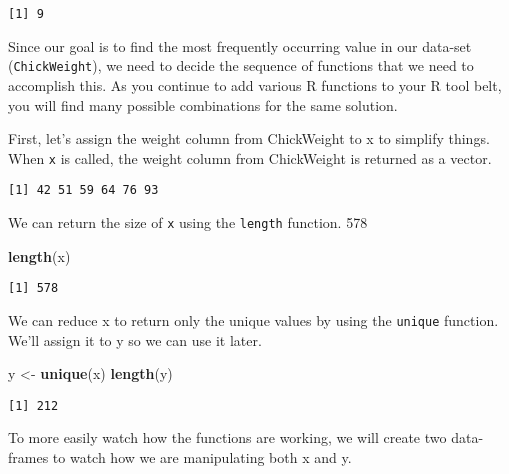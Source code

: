 \documentclass[12pt,]{article}
\newenvironment{Shaded}{\begin{snugshade}}{\end{snugshade}}
\newcommand{\KeywordTok}[1]{\textcolor[rgb]{0.13,0.29,0.53}{\textbf{#1}}}
\newcommand{\NormalTok}[1]{#1}
\newcommand{\OperatorTok}[1]{\textcolor[rgb]{0.81,0.36,0.00}{\textbf{#1}}}
\newcommand{\StringTok}[1]{\textcolor[rgb]{0.31,0.60,0.02}{#1}}
\begin{document}
\begin{verbatim}
[1] 9
\end{verbatim}

Since our goal is to find the most frequently occurring value in our
data-set (\texttt{ChickWeight}), we need to decide the sequence of
functions that we need to accomplish this. As you continue to add
various R functions to your R tool belt, you will find many possible
combinations for the same solution.

First, let's assign the weight column from ChickWeight to x to simplify
things. When \texttt{x} is called, the weight column from ChickWeight is
returned as a vector.

\begin{Shaded}
\end{Shaded}

\begin{verbatim}
[1] 42 51 59 64 76 93
\end{verbatim}

We can return the size of \texttt{x} using the \texttt{length} function.
578

\begin{Shaded}
\begin{Highlighting}[]
\KeywordTok{length}\NormalTok{(x)}
\end{Highlighting}
\end{Shaded}

\begin{verbatim}
[1] 578
\end{verbatim}

We can reduce x to return only the unique values by using the
\texttt{unique} function. We'll assign it to y so we can use it later.

\begin{Shaded}
\begin{Highlighting}[]
\NormalTok{y <-}\StringTok{ }\KeywordTok{unique}\NormalTok{(x)}
\KeywordTok{length}\NormalTok{(y)}
\end{Highlighting}
\end{Shaded}

\begin{verbatim}
[1] 212
\end{verbatim}

To more easily watch how the functions are working, we will create two
data-frames to watch how we are manipulating both x and y.
\end{document}
